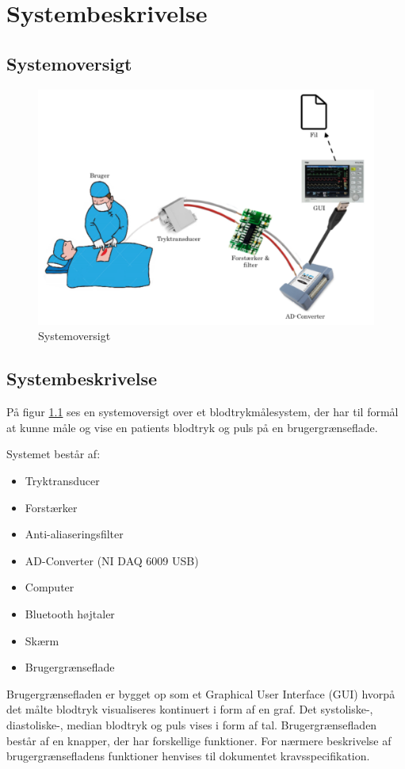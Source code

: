 \chapter{Systembeskrivelse}
\section{Systemoversigt}

	\begin{figure}[h!]
		\centering
		\includegraphics[width=0.55\linewidth]{Systembeskrivelse/Systemoversigt}
		\caption{Systemoversigt}
		\label{fig:Systemoversigt}
	\end{figure}
\vspace{1 cm}

\section{Systembeskrivelse}
På figur \ref{fig:Systemoversigt} ses en systemoversigt over et blodtrykmålesystem, der har til formål at kunne måle og vise en patients blodtryk og puls på en brugergrænseflade. 

Systemet består af:

\begin{itemize}
	\item Tryktransducer
	\item Forstærker
	\item Anti-aliaseringsfilter
	\item AD-Converter (NI DAQ 6009 USB)
	\item Computer
	\item Bluetooth højtaler
	\item Skærm
	\item Brugergrænseflade	
\end{itemize}

Brugergrænsefladen er bygget op som et Graphical User Interface (GUI) hvorpå det målte blodtryk visualiseres kontinuert i form af en graf. Det systoliske-, diastoliske-, median blodtryk og puls vises i form af tal. Brugergrænsefladen består af en knapper, der har forskellige funktioner. For nærmere beskrivelse af brugergrænsefladens funktioner henvises til dokumentet kravsspecifikation. \clearpage


